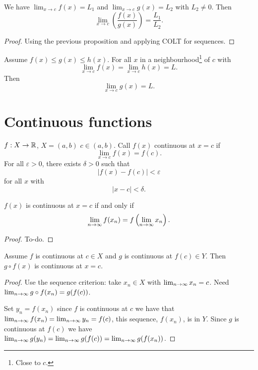 \begin{lemma}\label{lem:quotientlimits}
    We have $\lim_{x \to c}f(x) = L_1$ and $\lim_{x \to c}g(x) = L_2$ with $L_2 \neq 0$. Then
    \[
    \lim_{x \to c}\left(\frac{f(x)}{g(x)}\right) = \frac{L_1}{L_2}.
    \]
\end{lemma}
\begin{proof}
    Using the previous proposition and applying COLT for sequences.
\end{proof}

\begin{proposition}[Squeezing]\label{prop:fun_squeeze}
    Assume $f(x) \leq g(x) \leq h(x)$.
    For all $x$ in a neighbourhood\footnote{Close to $c$.} of $c$ with
    \[
    \lim_{x \to c}f(x) = \lim_{x \to c}h(x) = L.
    \]
    Then
    \[
    \lim_{x \to c}g(x) = L.
    \]
\end{proposition}

\section{Continuous functions}

\begin{definition}\label{def:continuityatpoint}
    $f : X \to \mathbb{R}$,
    $X = (a, b)$
    $c \in (a, b)$.
    Call $f(x)$ continuous at $x = c$ if
    \[
    \lim_{x \to c}f(x) = f(c).
    \]
    For all $\varepsilon > 0$,
    there exists $\delta > 0$ such that
    \[
    |f(x) - f(c)| < \varepsilon
    \]
    for all $x$ with
    \[
    |x - c| < \delta.
    \]
\end{definition}

\begin{proposition}\label{prop:continuityandlimits}
    $f(x)$ is continuous at $x = c$ if and only if
    \[
    \lim_{n \rightarrow \infty} f(x_n) = f\left(\lim_{n \rightarrow \infty} x_n\right).
    \]
\end{proposition}
\begin{proof}
    To-do.
\end{proof}

\begin{proposition}\label{prop:continuityofcomposition}
    Assume $f$ is continuous at $c \in X$ and $g$ is continuous at $f(c) \in Y$.
    Then $g \circ f(x)$ is continuous at $x = c$.
\end{proposition}
\begin{proof}
    Use the sequence criterion:
    take $x_n \in X$ with $\lim_{n \rightarrow \infty} x_n = c$.
    Need $\lim_{n \rightarrow \infty} g \circ f(x_n) = g(f(c))$.
    
    Set $y_n = f(x_n)$ since $f$ is continuous at $c$ we have that $\lim_{n \rightarrow \infty} f(x_n) = \lim_{n \rightarrow \infty} y_n = f(c)$,
    this sequence,
    $f(x_n)$,
    is in $Y$.
    Since $g$ is continuous at $f(c)$ we have $\lim_{n \rightarrow \infty} g(y_n) = \lim_{n \rightarrow \infty} g(f(c)) = \lim_{n \rightarrow \infty} g(f(x_n))$.
\end{proof}

